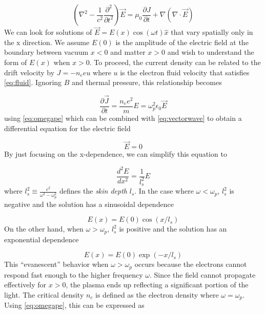 \begin{equation}
	(\nabla^2 - \frac{1}{c^2} \frac{\partial^2}{\partial t^2}) \vec{E} = \mu_0 \frac{\partial J}{\partial t} + \nabla(\nabla \cdot \vec{E}) \label{eq:vectorwave}
\end{equation}
We can look for solutions of $\vec{E} = E(x) \cos(\omega t) \hat{x}$ that vary spatially only in the x direction. We assume $E(0)$ is the amplitude of the electric field at the boundary between vacuum $x < 0$ and matter $x > 0$ and wish to understand the form of $E(x)$ when $x > 0$. To proceed, the current density can be related to the drift velocity \cite{Macchi_2013_Plasma} by $J = -n_e e u$ where $u$ is the electron fluid velocity that satisfies \cref{eq:fluid}. Ignoring $B$ and thermal pressure, this relationship becomes 

\begin{equation}
	\frac{\partial \vec{J}}{\partial t} = \frac{n_e e^2}{m} E = \omega_p^2 \epsilon_0 \vec{E}
\end{equation}
using \cref{eq:omegape} which can be combined with \cref{eq:vectorwave} to obtain a differential equation for the electric field

\begin{equation}
	[\nabla^2 + \frac{\omega^2}{c^2}(1 - \frac{\omega_p^2}{\omega^2})] \vec{E} = 0
\end{equation}
By just focusing on the x-dependence, we can simplify this equation to 

\begin{equation}
	\frac{d^2 E}{d x^2} = \frac{1}{l_s^2}  E
\end{equation}
where $l_s^2 \equiv \frac{c^2}{\omega^2 - \omega_p^2}$ defines the \emph{skin depth} $l_s$. In the case where $\omega < \omega_p$, $l_s^2$ is negative and the solution has a sinusoidal dependence

\begin{equation}
	E(x) = E(0) \cos(x / l_s)
\end{equation}
On the other hand, when $\omega > \omega_p$, $l_s^2$ is positive and the solution has an exponential dependence

\begin{equation}
	E(x) = E(0) \exp(-x / l_s)
\end{equation}
This ``evanescent'' behavior when $\omega > \omega_p$ occurs because the electrons cannot respond fast enough to the higher frequency $\omega$. Since the field cannot propagate effectively for $x > 0$, the plasma ends up reflecting a significant portion of the light. The critical density $n_c$ is defined as the electron density where $\omega = \omega_{p}$. Using \cref{eq:omegape}, this can be expressed as

